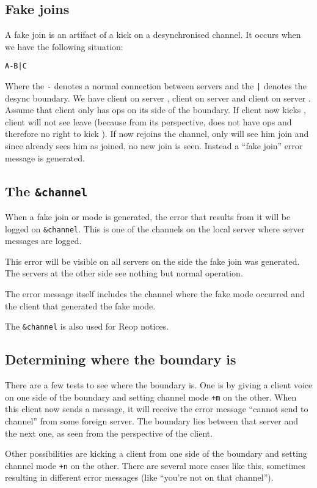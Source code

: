 \documentclass{article}
\theoremstyle{definition}
\begin{document}
\subsection{Fake joins} \label{sec:fj}
A fake join is an artifact of a kick on a desynchronised channel. It occurs
when we have the following situation:
\begin{center}
\verb#A-B|C#
\end{center}
Where the \verb#-# denotes a normal connection between servers and the \verb#|#
denotes the desync boundary. We have client  on server , client  on
server  and client  on server . Assume that client  only has ops on
its side of the boundary. If client  now kicks , client  will not see
 leave (because from its perspective,  does not have ops and therefore no
right to kick ). If  now rejoins the channel, only  will see him join
and since  already sees him as joined, no new join is seen. Instead a ``fake
join'' error message is generated.

\subsection{The \tt{\&channel}} \label{sec:chan}
When a fake join or mode is generated, the error that results from it will be
logged on \verb#&channel#. This is one of the channels on the local server
where server messages are logged.

This error will be visible on all servers on the side the fake join was
generated. The servers at the other side see nothing but normal operation.

The error message itself includes the channel where the fake mode occurred and
the client that generated the fake mode.

The \verb#&channel# is also used for Reop notices.

\subsection{Determining where the boundary is} \label{sec:det}
There are a few tests to see where the boundary is. One is by giving a client
voice on one side of the boundary and setting channel mode \verb#+m# on the
other. When this client now sends a message, it will receive the error message
``cannot send to channel'' from some foreign server. The boundary lies between
that server and the next one, as seen from the perspective of the client.

Other possibilities are kicking a client from one side of the boundary and
setting channel mode \verb#+n# on the other. There are several more cases like
this, sometimes resulting in different error messages (like ``you're not on
that channel'').
\end{document}
